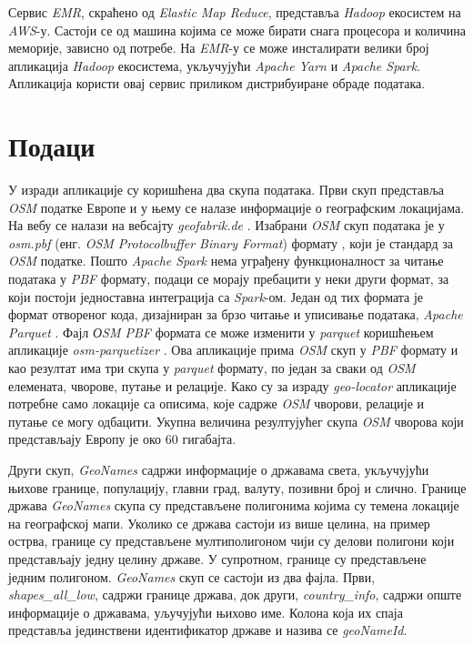\documentclass[12pt,oneside]{memoir}
\begin{document}
Сервис \textit{EMR}, скраћено од \textit{Elastic Map Reduce}, представља \textit{Hadoop} екосистем на \textit{AWS}-у. Састоји се од машина којима се може бирати снага процесора и количина меморије, зависно од потребе. На \textit{EMR}-у се може инсталирати велики број апликација \textit{Hadoop} екосистема, укључујући \textit{Apache Yarn} и \textit{Apache Spark}. Апликација користи овај сервис приликом дистрибуиране обраде података.
 
\section{Подаци}
\label{sec:osm_spark_podaci}

У изради апликације су коришћена два скупа података. Први скуп представља \textit{OSM} податке Европе и у њему се налазе информације о географским локацијама. На вебу се налази на вебсајту \textit{geofabrik.de} \cite{geofabrik}. Изабрани \textit{OSM} скуп података је у \textit{osm.pbf} (енг. \textit{OSM Protocolbuffer Binary Format}) формату \cite{osm_pbf_format}, који је стандард за \textit{OSM} податке. Пошто \textit{Apache Spark} нема уграђену функционалност за читање података у \textit{PBF} формату, подаци се морају пребацити у неки други формат, за који постоји једноставна интеграција са \textit{Spark}-ом. Један од тих формата је формат отвореног кода, дизајниран за брзо читање и уписивање података, \textit{Apache Parquet} \cite{apache_parquet}. Фајл \textit{ОSM PBF} формата се може изменити у \textit{parquet} коришћењем апликације \textit{osm-parquetizer} \cite{osm_parquetizer}. Ова апликације прима \textit{OSM} скуп у \textit{PBF} формату и као резултат има три скупа у \textit{parquet} формату, по један за сваки од \textit{OSM} елемената, чворове, путање и релације. Како су за израду \textit{geo-locator} апликације потребне само локације са описима, које садрже \textit{OSM} чворови, релације и путање се могу одбацити. Укупна величина резултујућег скупа \textit{OSM} чворова који представљају Европу је око 60 гигабајта.

Други скуп, \textit{GeoNames} \cite{geonames} садржи информације о државама света, укључујући њихове границе, популацију, главни град, валуту, позивни број и слично. Границе држава \textit{GeoNames} скупа су представљене полигонима којима су темена локације на географској мапи. Уколико се држава састоји из више целина, на пример острва, границе су представљене мултиполигоном чији су делови полигони који представљају једну целину државе. У супротном, границе су представљене једним полигоном. \textit{GeoNames} скуп се састоји из два фајла. Први, \textit{shapes\_all\_low}, садржи границе држава, док други, \textit{country\_info}, садржи опште информације о државама, уључујући њихово име. Колона која их спаја представља јединствени идентификатор државе и назива се \textit{geoNameId}.
\end{document}
